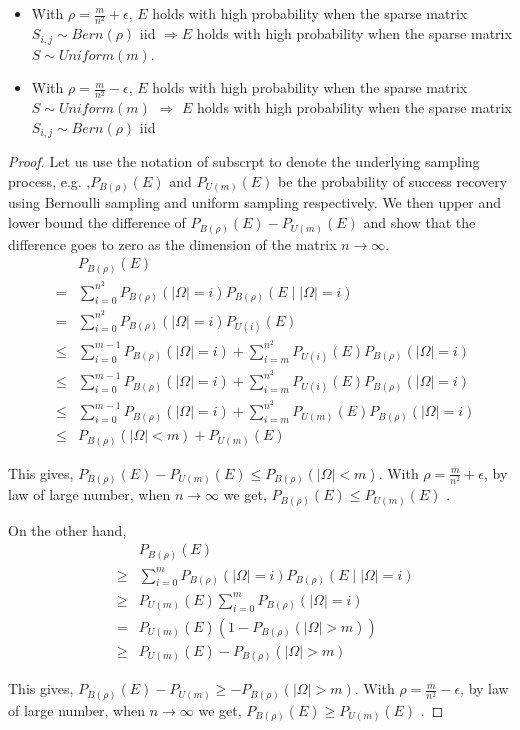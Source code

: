 \documentclass{../common/projectreport}
\begin{document}
\begin{itemize}
\item With $\rho=\frac{m}{n^{2}}+\epsilon$, $E$ holds with high probability when the sparse matrix $S_{i,j}\sim Bern(\rho)$ iid $\Longrightarrow$$E$ holds with high probability when the sparse matrix $S\sim Uniform(m)$. 
\item With $\rho=\frac{m}{n^{2}}-\epsilon$, $E$ holds with high probability when the sparse matrix $S\sim Uniform(m)$ $\Longrightarrow$ $E$ holds with high probability when the sparse matrix $S_{i,j}\sim Bern(\rho)$
iid 
\end{itemize}
\begin{proof}
Let us use the notation of subscrpt to denote the underlying sampling process, e.g. ,$P_{B(\rho)}(E)$ and $P_{U(m)}(E)$ be the probability of success recovery using Bernoulli sampling and uniform sampling respectively. We then upper and lower bound the difference of $P_{B(\rho)}(E)-P_{U(m)}(E)$ and show that the difference goes to zero as the dimension of the matrix $n\to\infty$. \\

\begin{eqnarray*}
 &  & P_{B(\rho)}(E)\\
 & = & \sum_{i=0}^{n^{2}}P_{B(\rho)}(|\Omega|=i)P_{B(\rho)}(E\mid|\Omega|=i)\\
 & = & \sum_{i=0}^{n^{2}}P_{B(\rho)}(|\Omega|=i)P_{U(i)}(E)\\
 & \le & \sum_{i=0}^{m-1}P_{B(\rho)}(|\Omega|=i)+\sum_{i=m}^{n^{2}}P_{U(i)}(E)P_{B(\rho)}(|\Omega|=i)\\
 & \le & \sum_{i=0}^{m-1}P_{B(\rho)}(|\Omega|=i)+\sum_{i=m}^{n^{2}}P_{U(i)}(E)P_{B(\rho)}(|\Omega|=i)\\
 & \le & \sum_{i=0}^{m-1}P_{B(\rho)}(|\Omega|=i)+\sum_{i=m}^{n^{2}}P_{U(m)}(E)P_{B(\rho)}(|\Omega|=i)\\
 & \le & P_{B(\rho)}(|\Omega|<m)+P_{U(m)}(E)
\end{eqnarray*}


This gives, $P_{B(\rho)}(E)-P_{U(m)}(E)\le P_{B(\rho)}(|\Omega|<m)$. With $\rho=\frac{m}{n^{2}}+\epsilon$, by law of large number, when $n\to\infty$ we get, $P_{B(\rho)}(E)\le P_{U(m)}(E)$ .

On the other hand, 
\begin{eqnarray*}
 &  & P_{B(\rho)}(E)\\
 & \ge & \sum_{i=0}^{m}P_{B(\rho)}(|\Omega|=i)P_{B(\rho)}(E\mid|\Omega|=i)\\
 & \ge & P_{U(m)}(E)\sum_{i=0}^{m}P_{B(\rho)}(|\Omega|=i)\\
 & = & P_{U(m)}(E)(1-P_{B(\rho)}(|\Omega|>m))\\
 & \ge & P_{U(m)}(E)-P_{B(\rho)}(|\Omega|>m)
\end{eqnarray*}


This gives, $P_{B(\rho)}(E)-P_{U(m)}\ge-P_{B(\rho)}(|\Omega|>m)$. With $\rho=\frac{m}{n^{2}}-\epsilon$, by law of large number, when $n\to\infty$ we get, $P_{B(\rho)}(E)\ge P_{U(m)}(E)$ .
\end{proof}
\end{document}
